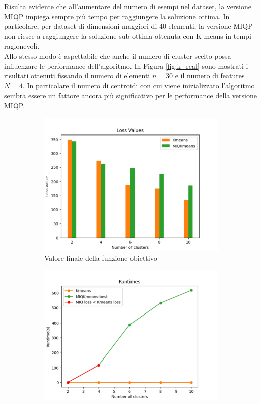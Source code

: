 \documentclass{article}
\begin{document}
    Risulta evidente che all'aumentare del numero di esempi nel dataset, la versione MIQP impiega sempre più tempo per raggiungere la soluzione ottima. In particolare, per dataset di dimensioni maggiori di 40 elementi, la versione MIQP non riesce a raggiungere la soluzione sub-ottima ottenuta con K-means in tempi ragionevoli.\\
    Allo stesso modo è aspettabile che anche il numero di cluster scelto possa influenzare le performance dell'algoritmo. In Figura \ref{fig:k_real} sono mostrati i risultati ottenuti fissando il numero di elementi $n=30$ e il numero di features $N=4$. In particolare il numero di centroidi con cui viene inizializzato l'algoritmo sembra essere un fattore ancora più significativo per le performance della versione MIQP.
    \begin{figure}[H]
     \centering
     \begin{subfigure}[t]{0.485\linewidth}
         \centering
         \includegraphics[width=\linewidth]{../results/plots/loss_centers_heart}
         \caption{Valore finale della funzione obiettivo}
     \end{subfigure}
     \hfill
     \begin{subfigure}[t]{0.49\linewidth}
         \centering
         \includegraphics[width=\linewidth]{../results/plots/runtime_centers_heart}

\end{subfigure}
\end{figure}
\end{document}

